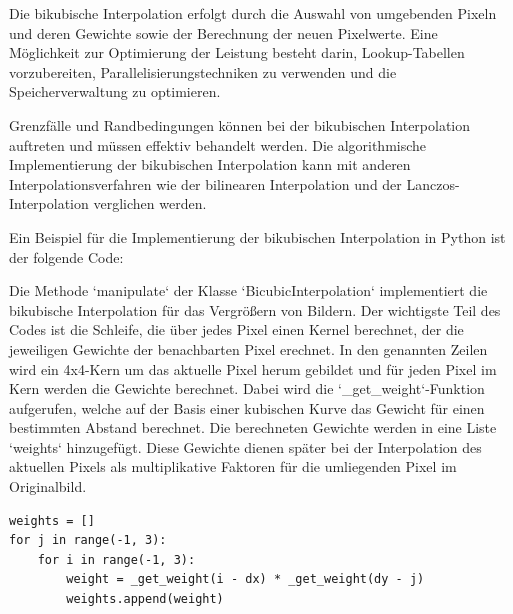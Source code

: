 
    
Die bikubische Interpolation erfolgt durch die Auswahl von umgebenden Pixeln und deren Gewichte sowie der Berechnung der neuen Pixelwerte. Eine Möglichkeit zur Optimierung der Leistung besteht darin, Lookup-Tabellen vorzubereiten, Parallelisierungstechniken zu verwenden und die Speicherverwaltung zu optimieren.

Grenzfälle und Randbedingungen können bei der bikubischen Interpolation auftreten und müssen effektiv behandelt werden. Die algorithmische Implementierung der bikubischen Interpolation kann mit anderen Interpolationsverfahren wie der bilinearen Interpolation und der Lanczos-Interpolation verglichen werden.

Ein Beispiel für die Implementierung der bikubischen Interpolation in Python ist der folgende Code:

Die Methode `manipulate` der Klasse `BicubicInterpolation` implementiert die bikubische Interpolation für das Vergrößern von Bildern. Der wichtigste Teil des Codes ist die Schleife, die über jedes Pixel einen Kernel berechnet, der die jeweiligen Gewichte der benachbarten Pixel erechnet. In den genannten Zeilen wird ein 4x4-Kern um das aktuelle Pixel herum gebildet und für jeden Pixel im Kern werden die Gewichte berechnet. Dabei wird die `_get_weight`-Funktion aufgerufen, welche auf der Basis einer kubischen Kurve das Gewicht für einen bestimmten Abstand berechnet. Die berechneten Gewichte werden in eine Liste `weights` hinzugefügt. Diese Gewichte dienen später bei der Interpolation des aktuellen Pixels als multiplikative Faktoren für die umliegenden Pixel im Originalbild.


\begin{lstlisting}
weights = []
for j in range(-1, 3):
    for i in range(-1, 3):
        weight = _get_weight(i - dx) * _get_weight(dy - j)
        weights.append(weight)
\end{lstlisting}

